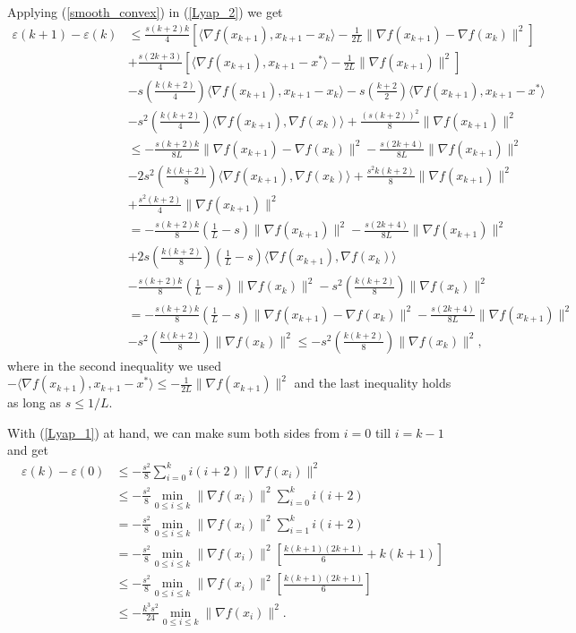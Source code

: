 \documentclass{article}
\theoremstyle{plain}
\theoremstyle{definition}
\theoremstyle{remark}
\begin{document}
Applying (\ref{smooth_convex}) in (\ref{Lyap_2}) we get
\begin{align}\label{Lyap_3}
     \varepsilon(k+1)-\varepsilon(k)&\leq \frac{s(k+2)k}{4}\left[ \langle \nabla f(x_{k+1}),x_{k+1}-x_k\rangle-\frac{1}{2L}\|\nabla f(x_{k+1})-\nabla f(x_k)\|^2 \right]\nonumber\\
     & +\frac{s(2k+3)}{4} \left[ \langle \nabla f(x_{k+1}),x_{k+1}-x^*\rangle-\frac{1}{2L}\|\nabla f(x_{k+1})\|^2 \right]\nonumber\\
     & -s(\frac{k(k+2)}{4})\langle \nabla f(x_{k+1}),x_{k+1}-x_k \rangle-s(\frac{k+2}{2})\langle \nabla f(x_{k+1}),x_{k+1}-x^* \rangle\nonumber\\
     & -s^2(\frac{k(k+2)}{4})\langle \nabla f(x_{k+1}),\nabla f(x_k)\rangle+ \frac{(s(k+2))^2}{8}\|\nabla f(x_{k+1})\|^2\nonumber\\
     &\leq -\frac{s(k+2)k}{8L}\|\nabla f(x_{k+1})-\nabla f(x_k)\|^2-\frac{s(2k+4)}{8L}\|\nabla f(x_{k+1})\|^2 \nonumber\\
     & -2s^2(\frac{k(k+2)}{8})\langle \nabla f(x_{k+1}),\nabla f(x_k)\rangle+\frac{s^2k(k+2)}{8}\|\nabla f(x_{k+1})\|^2\nonumber\\
     &+\frac{s^2(k+2)}{4}\|\nabla f(x_{k+1})\|^2\nonumber\\
     &=  -\frac{s(k+2)k}{8}(\frac{1}{L}-s)\|\nabla f(x_{k+1})\|^2-\frac{s(2k+4)}{8L}\|\nabla f(x_{k+1})\|^2\nonumber\\
     &+2s(\frac{k(k+2)}{8})(\frac{1}{L}-s)\langle \nabla f(x_{k+1}),\nabla f(x_k)\rangle\nonumber\\
     &-\frac{s(k+2)k}{8}(\frac{1}{L}-s)\|\nabla f(x_{k})\|^2-s^2(\frac{k(k+2)}{8})\|\nabla f(x_{k})\|^2\nonumber\\
     &= -\frac{s(k+2)k}{8}(\frac{1}{L}-s)\|\nabla f(x_{k+1})-\nabla f(x_k)\|^2-\frac{s(2k+4)}{8L}\|\nabla f(x_{k+1})\|^2\nonumber\\
     &-s^2(\frac{k(k+2)}{8})\|\nabla f(x_{k})\|^2\leq -s^2(\frac{k(k+2)}{8})\|\nabla f(x_{k})\|^2,
\end{align}
where in the second inequality we used $-\langle \nabla f(x_{k+1}),x_{k+1}-x^* \rangle\leq -\frac{1}{2L}\|\nabla f(x_{k+1})\|^2$ and the last inequality holds as long as $s\leq 1/L$.\par
With (\ref{Lyap_1}) at hand, we can make sum both sides from $i=0$ till $i=k-1$ and get
\begin{align}\label{Lyap_4}
        \varepsilon(k)-\varepsilon(0)&\leq -\frac{s^2}{8}\sum_{i=0}^{k} i(i+2)\|\nabla f(x_i)\|^2\nonumber\\
        & \leq -\frac{s^2}{8}\min_{0\leq i\leq k}\|\nabla f(x_i)\|^2\sum_{i=0}^{k} i(i+2)\nonumber\\
        &=-\frac{s^2}{8}\min_{0\leq i\leq k}\|\nabla f(x_i)\|^2\sum_{i=1}^{k} i(i+2)\nonumber\\
        &=-\frac{s^2}{8}\min_{0\leq i\leq k}\|\nabla f(x_i)\|^2\left[ \frac{k(k+1)(2k+1)}{6}+k(k+1) \right]\nonumber\\
        &\leq -\frac{s^2}{8}\min_{0\leq i\leq k}\|\nabla f(x_i)\|^2\left[ \frac{k(k+1)(2k+1)}{6}\right]\nonumber\\
        &\leq -\frac{k^3s^2}{24}\min_{0\leq i\leq k}\|\nabla f(x_i)\|^2.
\end{align}
\end{document}
